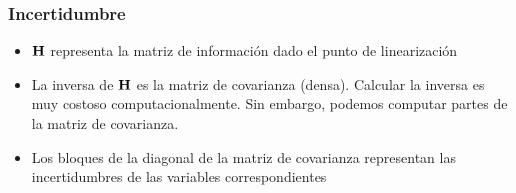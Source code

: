 \begin{frame}
    

\end{frame}


\begin{frame}
    \frametitle{Incertidumbre}
    
    \begin{itemize}
        \item $\boldsymbol{\mathbf{H}}$ representa la matriz de información dado el punto de linearización
        \item La inversa de $\boldsymbol{\mathbf{H}}$ es la matriz de covarianza (densa). Calcular la inversa es muy costoso computacionalmente. Sin embargo, podemos computar partes de la matriz de covarianza.
        \item Los bloques de la diagonal de la matriz de covarianza representan las incertidumbres de las variables correspondientes
    \end{itemize}
\end{frame}

